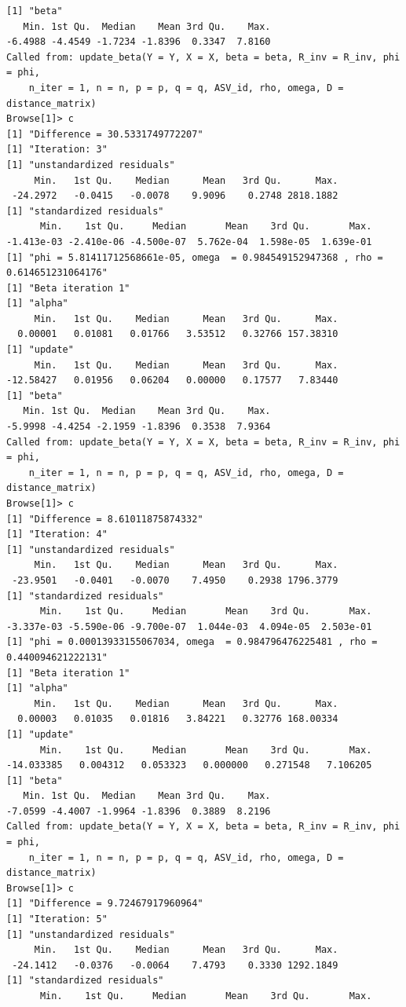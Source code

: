 \documentclass[10pt]{article}
\theoremstyle{definition}
\begin{document}
\begin{itemize}
\begin{verbatim}
[1] "beta"
   Min. 1st Qu.  Median    Mean 3rd Qu.    Max.
-6.4988 -4.4549 -1.7234 -1.8396  0.3347  7.8160
Called from: update_beta(Y = Y, X = X, beta = beta, R_inv = R_inv, phi = phi,
    n_iter = 1, n = n, p = p, q = q, ASV_id, rho, omega, D = distance_matrix)
Browse[1]> c
[1] "Difference = 30.5331749772207"
[1] "Iteration: 3"
[1] "unstandardized residuals"
     Min.   1st Qu.    Median      Mean   3rd Qu.      Max.
 -24.2972   -0.0415   -0.0078    9.9096    0.2748 2818.1882
[1] "standardized residuals"
      Min.    1st Qu.     Median       Mean    3rd Qu.       Max.
-1.413e-03 -2.410e-06 -4.500e-07  5.762e-04  1.598e-05  1.639e-01
[1] "phi = 5.81411712568661e-05, omega  = 0.984549152947368 , rho = 0.614651231064176"
[1] "Beta iteration 1"
[1] "alpha"
     Min.   1st Qu.    Median      Mean   3rd Qu.      Max.
  0.00001   0.01081   0.01766   3.53512   0.32766 157.38310
[1] "update"
     Min.   1st Qu.    Median      Mean   3rd Qu.      Max.
-12.58427   0.01956   0.06204   0.00000   0.17577   7.83440
[1] "beta"
   Min. 1st Qu.  Median    Mean 3rd Qu.    Max.
-5.9998 -4.4254 -2.1959 -1.8396  0.3538  7.9364
Called from: update_beta(Y = Y, X = X, beta = beta, R_inv = R_inv, phi = phi,
    n_iter = 1, n = n, p = p, q = q, ASV_id, rho, omega, D = distance_matrix)
Browse[1]> c
[1] "Difference = 8.61011875874332"
[1] "Iteration: 4"
[1] "unstandardized residuals"
     Min.   1st Qu.    Median      Mean   3rd Qu.      Max.
 -23.9501   -0.0401   -0.0070    7.4950    0.2938 1796.3779
[1] "standardized residuals"
      Min.    1st Qu.     Median       Mean    3rd Qu.       Max.
-3.337e-03 -5.590e-06 -9.700e-07  1.044e-03  4.094e-05  2.503e-01
[1] "phi = 0.00013933155067034, omega  = 0.984796476225481 , rho = 0.440094621222131"
[1] "Beta iteration 1"
[1] "alpha"
     Min.   1st Qu.    Median      Mean   3rd Qu.      Max.
  0.00003   0.01035   0.01816   3.84221   0.32776 168.00334
[1] "update"
      Min.    1st Qu.     Median       Mean    3rd Qu.       Max.
-14.033385   0.004312   0.053323   0.000000   0.271548   7.106205
[1] "beta"
   Min. 1st Qu.  Median    Mean 3rd Qu.    Max.
-7.0599 -4.4007 -1.9964 -1.8396  0.3889  8.2196
Called from: update_beta(Y = Y, X = X, beta = beta, R_inv = R_inv, phi = phi,
    n_iter = 1, n = n, p = p, q = q, ASV_id, rho, omega, D = distance_matrix)
Browse[1]> c
[1] "Difference = 9.72467917960964"
[1] "Iteration: 5"
[1] "unstandardized residuals"
     Min.   1st Qu.    Median      Mean   3rd Qu.      Max.
 -24.1412   -0.0376   -0.0064    7.4793    0.3330 1292.1849
[1] "standardized residuals"
      Min.    1st Qu.     Median       Mean    3rd Qu.       Max.

\end{verbatim}
\end{itemize}
\end{document}
